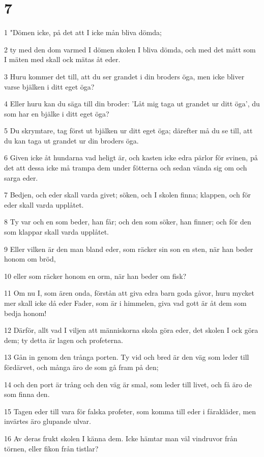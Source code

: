 \chapter{7}

\par 1 "Dömen icke, på det att I icke mån bliva dömda;
\par 2 ty med den dom varmed I dömen skolen I bliva dömda, och med det mått som I mäten med skall ock mätas åt eder.
\par 3 Huru kommer det till, att du ser grandet i din broders öga, men icke bliver varse bjälken i ditt eget öga?
\par 4 Eller huru kan du säga till din broder: 'Låt mig taga ut grandet ur ditt öga', du som har en bjälke i ditt eget öga?
\par 5 Du skrymtare, tag först ut bjälken ur ditt eget öga; därefter må du se till, att du kan taga ut grandet ur din broders öga.
\par 6 Given icke åt hundarna vad heligt är, och kasten icke edra pärlor för svinen, på det att dessa icke må trampa dem under fötterna och sedan vända sig om och sarga eder.
\par 7 Bedjen, och eder skall varda givet; söken, och I skolen finna; klappen, och för eder skall varda upplåtet.
\par 8 Ty var och en som beder, han får; och den som söker, han finner; och för den som klappar skall varda upplåtet.
\par 9 Eller vilken är den man bland eder, som räcker sin son en sten, när han beder honom om bröd,
\par 10 eller som räcker honom en orm, när han beder om fisk?
\par 11 Om nu I, som ären onda, förstån att giva edra barn goda gåvor, huru mycket mer skall icke då eder Fader, som är i himmelen, giva vad gott är åt dem som bedja honom!
\par 12 Därför, allt vad I viljen att människorna skola göra eder, det skolen I ock göra dem; ty detta är lagen och profeterna.
\par 13 Gån in genom den trånga porten. Ty vid och bred är den väg som leder till fördärvet, och många äro de som gå fram på den;
\par 14 och den port är trång och den väg är smal, som leder till livet, och få äro de som finna den.
\par 15 Tagen eder till vara för falska profeter, som komma till eder i fårakläder, men invärtes äro glupande ulvar.
\par 16 Av deras frukt skolen I känna dem. Icke hämtar man väl vindruvor från törnen, eller fikon från tistlar?
